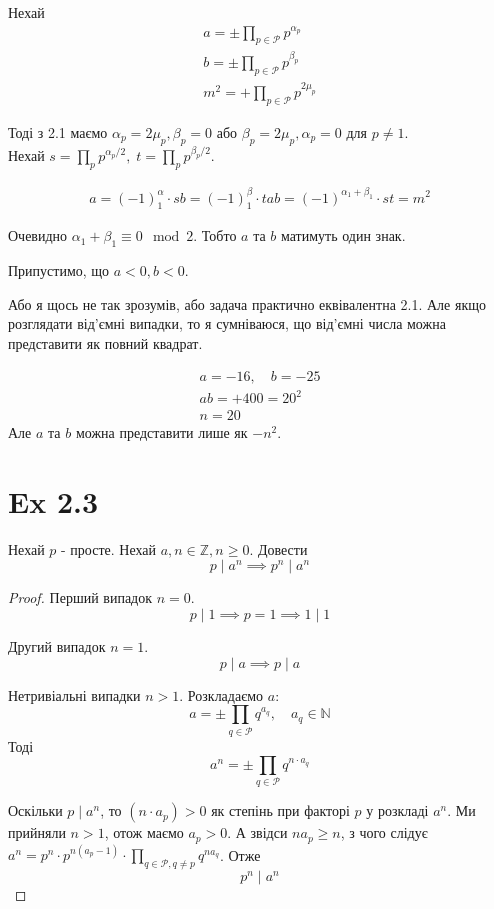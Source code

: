 \documentclass[11pt, a4paper]{article} %
\newcommand{\N}{\mathbb{N}}
\newcommand{\Z}{\mathbb{Z}}
\begin{document}
Нехай 
\begin{gather*}
    a = \pm\prod_{p\in\mathcal{P}} p^{\alpha_p}\\
    b = \pm\prod_{p\in\mathcal{P}} p^{\beta_p}\\
    m^2 = +\prod_{p\in\mathcal{P}} p^{2\mu_p}
\end{gather*}

Тоді з 2.1 маємо $\alpha_p = 2\mu_p, \beta_p = 0$ або $\beta_p = 2\mu_p, \alpha_p=0$ для $p\ne 1$.\\
Нехай $s = \prod_p p^{\alpha_p/2}, \; t = \prod_p p^{\beta_p/2}$.

\begin{gather*}
    a = (-1)^\alpha_1 \cdot s
    b = (-1)^\beta_1 \cdot t
    ab = (-1)^{\alpha_1+\beta_1} \cdot st = m^2
\end{gather*}

Очевидно $\alpha_1+\beta_1 \equiv 0 \mod 2$.
Тобто $a$ та $b$ матимуть один знак.

Припустимо, що $a<0, b<0$.

Або я щось не так зрозумів, або задача практично еквівалентна 2.1. 
Але якщо розглядати від'ємні випадки, то я сумніваюся, що від'ємні числа можна представити як повний квадрат.

\begin{gather*}
    a = -16, \quad b = -25\\
    ab = +400 = 20^2\\
    n = 20
\end{gather*}
Але $a$ та $b$ можна представити лише як $-n^2$.

\section*{Ex 2.3}
\begin{mdframed}
    Нехай $p$ - просте. Нехай $a,n\in\Z, n\ge 0$. 
    Довести
    $$p\mid a^n \implies p^n\mid a^n$$
\end{mdframed}

\begin{proof}
    Перший випадок $n=0$.
    \[p\mid 1 \implies p = 1 \implies 1 \mid 1\]

    Другий випадок $n=1$.
    \[p\mid a \implies p \mid a\]

    Нетривіальні випадки $n>1$.
    Розкладаємо $a$:
    \[a = \pm \prod_{q\in\mathcal{P}}q^{a_q}, \quad a_q\in\N\]
    Тоді
    \[a^n = \pm \prod_{q\in\mathcal{P}}q^{n \cdot a_q}\]

    Оскільки $p\mid a^n$, то $(n\cdot a_p) > 0$ як степінь при факторі $p$ у розкладі $a^n$.
    Ми прийняли $n>1$, отож маємо $a_p > 0$.
    А звідси $na_p \ge n$, з чого слідує $a^n = p^{n} \cdot p^{n(a_p-1)} \cdot \prod_{q\in\mathcal{P}, q\ne p}q^{na_q}$.
    Отже
    \[p^n \mid a^n\]
\end{proof}
\end{document}
